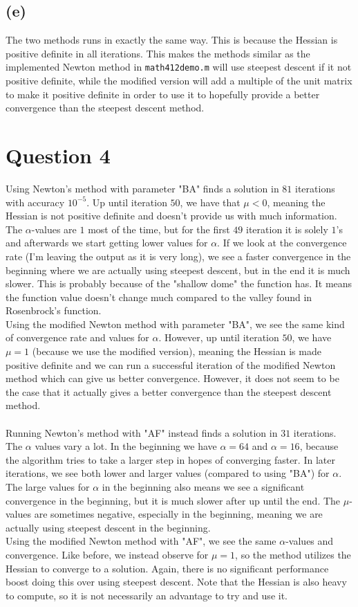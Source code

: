 \documentclass[a4paper, fleqn]{article}
\begin{document}
\subsection{(e)}
The two methods runs in exactly the same way. This is because the Hessian is positive definite in all iterations. This makes the methods similar as the implemented Newton method in \texttt{math412demo.m} will use steepest descent if it not positive definite, while the modified version will add a multiple of the unit matrix to make it positive definite in order to use it to hopefully provide a better convergence than the steepest descent method.

\section{Question 4}
Using Newton's method with parameter "BA" finds a solution in $81$ iterations with accuracy $10^{-5}$. Up until iteration $50$, we have that $\mu<0$, meaning the Hessian is not positive definite and doesn't provide us with much information. The $\alpha$-values are $1$ most of the time, but for the first $49$ iteration it is solely $1$'s and afterwards we start getting lower values for $\alpha$. If we look at the convergence rate (I'm leaving the output as it is very long), we see a faster convergence in the beginning where we are actually using steepest descent, but in the end it is much slower. This is probably because of the "shallow dome" the function has. It means the function value doesn't change much compared to the valley found in Rosenbrock's function. \\
Using the modified Newton method with parameter "BA", we see the same kind of convergence rate and values for $\alpha$. However, up until iteration $50$, we have $\mu = 1$ (because we use the modified version), meaning the Hessian is made positive definite and we can run a successful iteration of the modified Newton method which can give us better convergence. However, it does not seem to be the case that it actually gives a better convergence than the steepest descent method. \\
\\
Running Newton's method with "AF" instead finds a solution in $31$ iterations. The $\alpha$ values vary a lot. In the beginning we have $\alpha=64$ and $\alpha=16$, because the algorithm tries to take a larger step in hopes of converging faster. In later iterations, we see both lower and larger values (compared to using "BA") for $\alpha$. The large values for $\alpha$ in the beginning also means we see a significant convergence in the beginning, but it is much slower after up until the end. The $\mu$-values are sometimes negative, especially in the beginning, meaning we are actually using steepest descent in the beginning. \\
Using the modified Newton method with "AF", we see the same $\alpha$-values and convergence. Like before, we instead observe for $\mu=1$, so the method utilizes the Hessian to converge to a solution. Again, there is no significant performance boost doing this over using steepest descent. Note that the Hessian is also heavy to compute, so it is not necessarily an advantage to try and use it.
\end{document}
